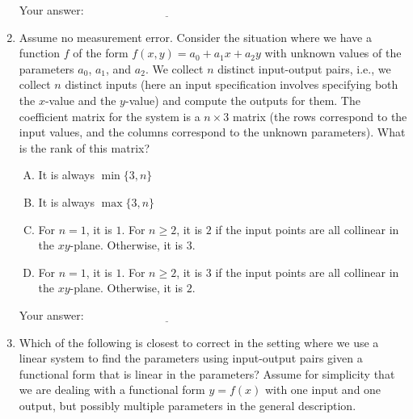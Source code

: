 \documentclass[10pt]{amsart}
\begin{document}
\begin{enumerate}
  \vspace{0.1in}
  Your answer: $\underline{\qquad\qquad\qquad\qquad\qquad\qquad\qquad}$
  \vspace{0.1in}

\item Assume no measurement error. Consider the situation where we
  have a function $f$ of the form $f(x,y) = a_0 + a_1x + a_2y$ with
  unknown values of the parameters $a_0$, $a_1$, and $a_2$. We collect
  $n$ distinct input-output pairs, i.e., we collect $n$ distinct
  inputs (here an input specification involves specifying both the
  $x$-value and the $y$-value) and compute the outputs for them. The
  coefficient matrix for the system is a $n \times 3$ matrix (the rows
  correspond to the input values, and the columns correspond to the
  unknown parameters). What is the rank of this matrix?

  \begin{enumerate}[(A)]
  \item It is always $\min \{ 3,n \}$
  \item It is always $\max \{ 3,n \}$
  \item For $n = 1$, it is $1$. For $n \ge 2$, it is $2$ if the input
    points are all collinear in the $xy$-plane. Otherwise, it is $3$.
  \item For $n = 1$, it is $1$. For $n \ge 2$, it is $3$ if the input
    points are all collinear in the $xy$-plane. Otherwise, it is $2$.
  \end{enumerate}

  \vspace{0.1in}
  Your answer: $\underline{\qquad\qquad\qquad\qquad\qquad\qquad\qquad}$
  \vspace{0.1in}

\item Which of the following is closest to correct in the setting
  where we use a linear system to find the parameters using
  input-output pairs given a functional form that is linear in the
  parameters? Assume for simplicity that we are dealing with a
  functional form $y = f(x)$ with one input and one output, but
  possibly multiple parameters in the general description.


\end{enumerate}
\end{document}
